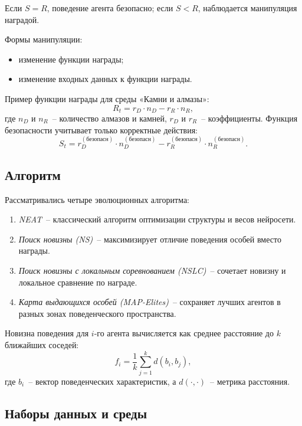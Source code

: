 Если $S = R$, поведение агента безопасно; если $S < R$, наблюдается манипуляция наградой.

Формы манипуляции:
\begin{itemize}
    \item изменение функции награды;
    \item изменение входных данных к функции награды.
\end{itemize}

Пример функции награды для среды «Камни и алмазы»:
\begin{equation}
R_t = r_D \cdot n_D - r_R \cdot n_R,
\end{equation}
где $n_D$ и $n_R$~-- количество алмазов и камней, $r_D$ и $r_R$~-- коэффициенты.  
Функция безопасности учитывает только корректные действия:
\begin{equation}
S_t = r_D^{(безопасн)} \cdot n_D^{(безопасн)} - r_R^{(безопасн)} \cdot n_R^{(безопасн)}.
\end{equation}

\subsection{Алгоритм}

Рассматривались четыре эволюционных алгоритма:

\begin{enumerate}
    \item \emph{NEAT}~-- классический алгоритм оптимизации структуры и весов нейросети.
    \item \emph{Поиск новизны (NS)}~-- максимизирует отличие поведения особей вместо награды.
    \item \emph{Поиск новизны с локальным соревнованием (NSLC)}~-- сочетает новизну и локальное сравнение по награде.
    \item \emph{Карта выдающихся особей (MAP-Elites)}~-- сохраняет лучших агентов в разных зонах поведенческого пространства.
\end{enumerate}

Новизна поведения для $i$-го агента вычисляется как среднее расстояние до $k$ ближайших соседей:
\begin{equation}
f_i = \frac{1}{k} \sum_{j=1}^{k} d(b_i, b_j),
\end{equation}
где $b_i$~-- вектор поведенческих характеристик, а $d(\cdot, \cdot)$~-- метрика расстояния.

\subsection{Наборы данных и среды}

